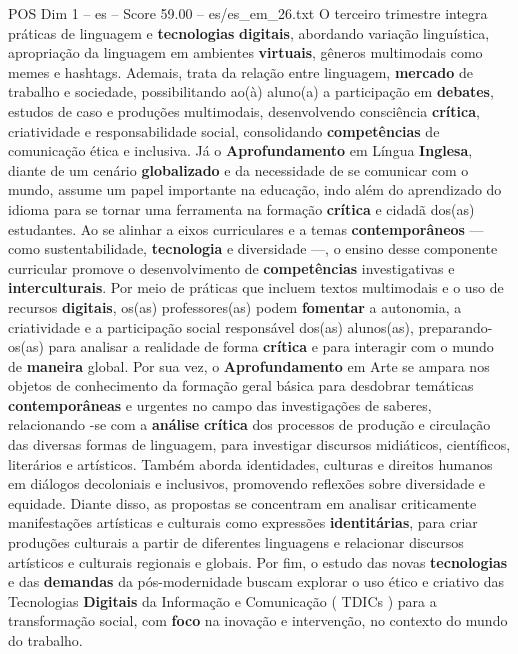 \begin{textsample}{POS Dim 1 – es – Score 59.00 – es/es\_em\_26.txt}
O terceiro trimestre integra práticas de linguagem e \textbf{tecnologias} \textbf{digitais}, abordando variação linguística, apropriação da linguagem em ambientes \textbf{virtuais}, gêneros multimodais como memes e hashtags.
Ademais, trata da relação entre linguagem, \textbf{mercado} de trabalho e sociedade, possibilitando ao(à) aluno(a) a participação em \textbf{debates}, estudos de caso e produções multimodais, desenvolvendo consciência \textbf{crítica}, criatividade e responsabilidade social, consolidando \textbf{competências} de comunicação ética e inclusiva.
Já o \textbf{Aprofundamento} em Língua \textbf{Inglesa}, diante de um cenário \textbf{globalizado} e da necessidade de se comunicar com o mundo, assume um papel importante na educação, indo além do aprendizado do idioma para se tornar uma ferramenta na formação \textbf{crítica} e cidadã dos(as) estudantes.
Ao se alinhar a eixos curriculares e a temas \textbf{contemporâneos} — como sustentabilidade, \textbf{tecnologia} e diversidade —, o ensino desse componente curricular promove o desenvolvimento de \textbf{competências} investigativas e \textbf{interculturais}.
Por meio de práticas que incluem textos multimodais e o uso de recursos \textbf{digitais}, os(as) professores(as) podem \textbf{fomentar} a autonomia, a criatividade e a participação social responsável dos(as) alunos(as), preparando-os(as) para analisar a realidade de forma \textbf{crítica} e para interagir com o mundo de \textbf{maneira} global.
Por sua vez, o \textbf{Aprofundamento} em Arte se ampara nos objetos de conhecimento da formação geral básica para desdobrar temáticas \textbf{contemporâneas} e urgentes no campo das investigações de saberes, relacionando -se com a \textbf{análise} \textbf{crítica} dos processos de produção e circulação das diversas formas de linguagem, para investigar discursos midiáticos, científicos, literários e artísticos.
Também aborda identidades, culturas e direitos humanos em diálogos decoloniais e inclusivos, promovendo reflexões sobre diversidade e equidade.
Diante disso, as propostas se concentram em analisar criticamente manifestações artísticas e culturais como expressões \textbf{identitárias}, para criar produções culturais a partir de diferentes linguagens e relacionar discursos artísticos e culturais regionais e globais.
Por fim, o estudo das novas \textbf{tecnologias} e das \textbf{demandas} da pós-modernidade buscam explorar o uso ético e criativo das Tecnologias \textbf{Digitais} da Informação e Comunicação ( TDICs ) para a transformação social, com \textbf{foco} na inovação e intervenção, no contexto do mundo do trabalho.

\end{textsample}
